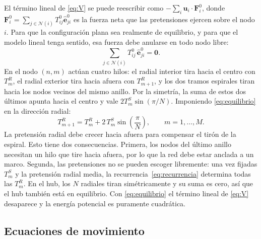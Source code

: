 \documentclass[11pt,letterpaper]{article}
\begin{document}
El término lineal de \eqref{eq:V} se puede reescribir como
$-\sum_i \mathbf{u}_i\cdot\mathbf{F}^0_i$, donde
$\mathbf{F}^0_i=\sum_{j\in\mathcal{N}(i)}T^0_{ij}\hat{\mathbf{e}}^0_{ji}$ es
la fuerza neta que las pretensiones ejercen sobre el nodo $i$. Para que la
configuración plana sea realmente de equilibrio, y para que el modelo lineal
tenga sentido, esa fuerza debe anularse en todo nodo libre:
\begin{equation}\label{eq:equilibrio}
    \sum_{j\in\mathcal{N}(i)} T^0_{ij}\,\hat{\mathbf{e}}^0_{ji} = \mathbf{0}.
\end{equation}
En el nodo $(n,m)$ actúan cuatro hilos: el radial interior tira hacia el
centro con $T^R_m$, el radial exterior tira hacia afuera con $T^R_{m+1}$, y
los dos tramos espirales tiran hacia los nodos vecinos del mismo anillo. Por
la simetría, la suma de estos dos últimos apunta hacia el centro y vale
$2T^S_m\sin(\pi/N)$. Imponiendo \eqref{eq:equilibrio} en la dirección radial:
\begin{equation}\label{eq:recurrencia}
    T^R_{m+1} = T^R_m + 2\,T^S_m\sin\!\left(\frac{\pi}{N}\right),
    \qquad m = 1,\dots,M.
\end{equation}
La pretensión radial debe crecer hacia afuera para compensar el tirón de la
espiral. Esto tiene dos consecuencias. Primera, los nodos del último anillo
necesitan un hilo que tire hacia afuera, por lo que la red debe estar anclada
a un marco. Segunda, las pretensiones no se pueden escoger libremente: una
vez fijadas $T^S_m$ y la pretensión radial media, la
recurrencia~\eqref{eq:recurrencia} determina todas las $T^R_m$. En el hub,
los $N$ radiales tiran simétricamente y su suma es cero, así que el hub
también está en equilibrio. Con \eqref{eq:equilibrio} el término lineal de
\eqref{eq:V} desaparece y la energía potencial es puramente cuadrática.

\subsection{Ecuaciones de movimiento}
\end{document}

